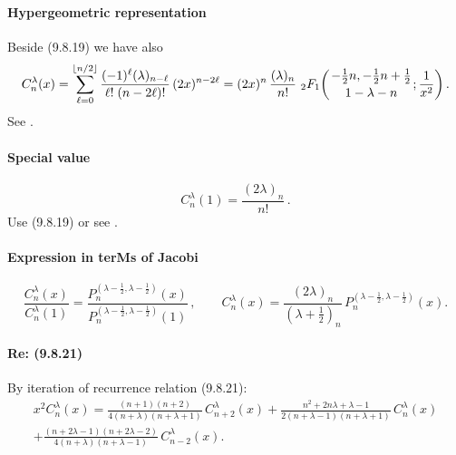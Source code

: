 \documentclass[twoside,11pt]{article}
\newcommand\la\lambda
\newcommand\half{\frac12}
\newcommand\thalf{\tfrac12}
\newcommand{\hyp}[5]{\,\mbox{}_{#1}F_{#2}\!\left( 
  \genfrac{}{}{0pt}{}{#3}{#4};#5\right)}
\begin{document}
\paragraph{Hypergeometric representation} 
Beside (9.8.19) we have also 
\begin{equation} 
C_n^\lambda(x)=\sum_{\ell=0}^{\lfloor n/2\rfloor}\frac{(-1)^{\ell}(\lambda)_{n-\ell}} 
{\ell!\;(n-2\ell)!}\,(2x)^{n-2\ell} 
=(2x)^{n}\,\frac{(\lambda)_{n}}{n!}\, 
\hyp21{-\thalf n,-\thalf n+\thalf}{1-\la-n}{\frac1{x^2}}. 
\label{57} 
\end{equation} 
See . 
% 
\paragraph{Special value} 
\begin{equation} 
C_n^{\la}(1)=\frac{(2\la)_n}{n!}\,. 
\label{49} 
\end{equation} 
Use (9.8.19) or see . 
% 
\paragraph{Expression in terMs of Jacobi} 
% 
\begin{equation} 
\frac{C_n^\la(x)}{C_n^\la(1)}= 
\frac{P_n^{(\la-\half,\la-\half)}(x)}{P_n^{(\la-\half,\la-\half)}(1)}\,,\qquad 
C_n^\la(x)=\frac{(2\la)_n}{(\la+\thalf)_n}\,P_n^{(\la-\half,\la-\half)}(x). 
\label{65} 
\end{equation} 
% 
\paragraph{Re: (9.8.21)} 
By iteration of recurrence relation (9.8.21): 
\begin{multline} 
x^2 C_n^\la(x)= 
\frac{(n+1)(n+2)}{4(n+\la)(n+\la+1)}\,C_{n+2}^\la(x)+ 
\frac{n^2+2n\la+\la-1}{2(n+\la-1)(n+\la+1)}\,C_n^\la(x)\\ 
+\frac{(n+2\la-1)(n+2\la-2)}{4(n+\la)(n+\la-1)}\,C_{n-2}^\la(x). 
\label{6} 
\end{multline} 
% 
\end{document}
